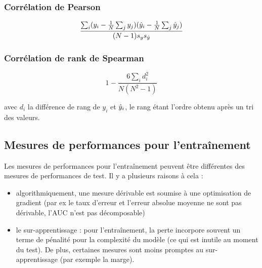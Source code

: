 		\subsubsection{Corrélation de Pearson}
		
		$$\frac{\sum_i (y_i - \frac{1}{N} \sum_j y_j)(\hat{y}_i - \frac{1}{N} \sum_j \hat{y}_j)}{(N - 1)s_y s_{\hat{y}} }$$
		 		
		\subsubsection{Corrélation de rank de Spearman}
		
		$$1 - \frac{6 \sum_i d_i^2}{N(N^2 - 1)}$$
		
		avec $d_i$ la différence de rang de $y_i$ et $\hat{y}_i$, le rang étant l'ordre obtenu après un tri des valeurs.
		
	\subsection{Mesures de performances pour l'entraînement}
	
	Les mesures de performances pour l'entraînement peuvent être différentes des mesures de performances de test. Il y a plusieurs raisons à cela :
	
	\begin{itemize}
		\item algorithmiquement, une mesure dérivable est soumise à une optimisation de gradient (par ex le taux d'erreur et l'erreur absolue moyenne ne sont pas dérivable, l'AUC n'est pas décomposable)
		\item le sur-apprentissage : pour l'entraînement, la perte incorpore souvent un terme de pénalité pour la complexité du modèle (ce qui est inutile au moment du test). De plus, certaines mesures sont moins promptes au sur-apprentissage (par exemple la marge).
	\end{itemize}
	